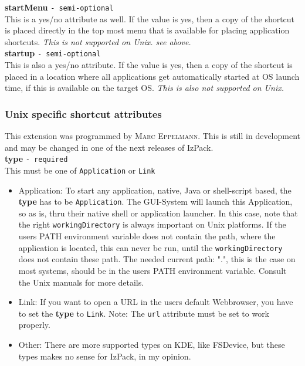 \textbf{startMenu} \texttt{- semi-optional}\\

This is a yes/no attribute as well. If the value is yes, then a copy of
the shortcut is placed directly in the top most menu that is available
for placing application shortcuts.
\textit{This is not supported on Unix. see above.}\\

\textbf{startup} \texttt{- semi-optional}\\

This is also a yes/no attribute. If the value is yes, then a copy of the
shortcut is placed in a location where all applications get automatically
started at OS launch time, if this is available on the target OS.
\textit{This is also not supported on Unix.}\\

\subsubsection{Unix specific shortcut attributes }

This extension was programmed by \textsc{Marc Eppelmann}.
This is still in development and may be changed in
one of the next releases of IzPack.\\

\textbf{type} \texttt{- required}\\

This must be one of \texttt{Application} or \texttt{Link}\\

\begin{itemize}

\item Application: To start any application, native, Java or shell-script based,
the \textbf{type} has to be \texttt{Application}. The GUI-System will launch
this Application, so as is, thru their native shell or application launcher.
In this case, note that the right \texttt{workingDirectory}
is always important on Unix platforms. If the users PATH environment
variable does not contain the path, where the application is located,
this can never be run, until the \texttt{workingDirectory} does not contain
these path. The needed current path: ".", this is the case on most
systems, should be in the users PATH environment variable.
Consult the Unix manuals for more details.

\item Link: If you want to open a URL in the users default Webbrowser,
you have to set the \textbf{type} to \texttt{Link}. Note: The \texttt{url} attribute
must be set to work properly.

\item Other: There are more supported types on KDE, like FSDevice,
but these types makes no sense for IzPack, in my opinion.
\end{itemize}

